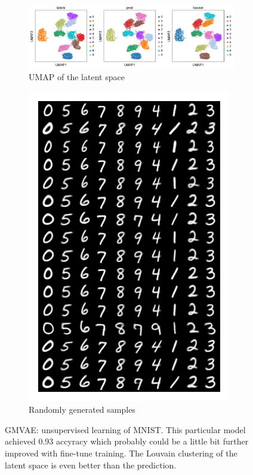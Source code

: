 \documentclass[11pt, a4paper]{report}
\theoremstyle{plain}
\theoremstyle{definition}
\theoremstyle{remark}
\begin{document}
\begin{figure}[h]
\centering
\begin{subfigure}[b]{1.01\textwidth}
\includegraphics[width=\textwidth]{images/gmmvae_mnist_us_latent_umap.png}
\caption{UMAP of the latent space}
\label{fig:mnist_us_latent}
\end{subfigure}
\begin{subfigure}[b]{0.3\textwidth}
\includegraphics[width=\textwidth]{images/gmmvae_mnist_us_samples2.png}
\caption{Randomly generated samples}
\label{fig:mnist_us_samples}
\end{subfigure}
\caption{GMVAE: unsupervised learning of MNIST. This particular model
achieved 0.93 accyracy which probably could be a little bit further
improved with fine-tune training. The Louvain clustering of the latent space is even better
than the prediction.}
\label{fig:mnist_us_10}
\end{figure}
\end{document}
